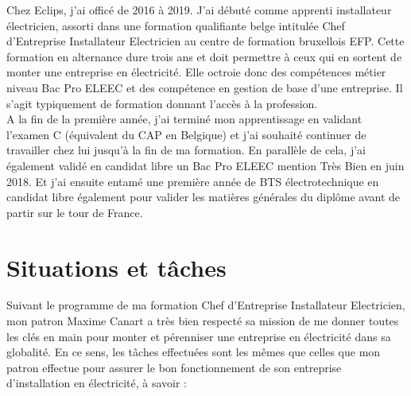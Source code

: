 \documentclass[a4paper, 12pt]{article}
\begin{document}
Chez Eclips, j'ai officé de 2016 à 2019. J'ai débuté comme apprenti installateur électricien, assorti dans une formation qualifiante belge intitulée \og Chef d'Entreprise Installateur Electricien \fg{} au centre de formation bruxellois EFP.  Cette formation en alternance dure trois ans et doit permettre à ceux qui en sortent de monter une entreprise en électricité. Elle octroie donc des compétences métier niveau Bac Pro ELEEC et des compétence en gestion de base d'une entreprise. Il s'agit typiquement de formation donnant l'accès à la profession.\\

A la fin de la première année, j'ai terminé mon apprentissage en validant l'examen C (équivalent du CAP en Belgique) et j'ai souhaité continuer de travailler chez lui jusqu'à la fin de ma formation. En parallèle de cela, j'ai également validé en candidat libre un Bac Pro ELEEC mention Très Bien en juin 2018. Et j'ai ensuite entamé une première année de BTS électrotechnique en candidat libre également pour valider les matières générales du diplôme avant de partir sur le tour de France.\\

 
 \section{Situations et tâches}

Suivant le programme de ma formation Chef d'Entreprise Installateur Electricien, mon patron Maxime Canart a très bien respecté sa mission de me donner toutes les clés en main pour monter et pérenniser une entreprise en électricité dans sa globalité. En ce sens, les tâches effectuées sont les mêmes que celles que mon patron effectue pour assurer le bon fonctionnement de son entreprise d'installation en électricité, à savoir :
\end{document}
